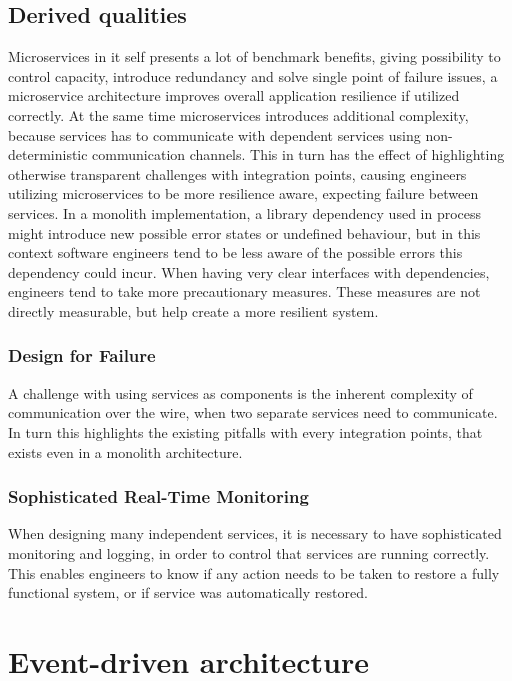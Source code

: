 \subsection{Derived qualities}
Microservices in it self presents a lot of benchmark benefits, giving possibility to control capacity, introduce redundancy and solve single point of failure issues, a microservice architecture improves overall application resilience if utilized correctly. At the same time microservices introduces additional complexity, because services has to communicate with dependent services using non-deterministic communication channels. This in turn has the effect of highlighting otherwise transparent challenges with integration points, causing engineers utilizing microservices to be more resilience aware, expecting failure between services. In a monolith implementation, a library dependency used in process might introduce new possible error states or undefined behaviour, but in this context software engineers tend to be less aware of the possible errors this dependency could incur. When having very clear interfaces with dependencies, engineers tend to take more precautionary measures. These measures are not directly measurable, but help create a more resilient system. 

\subsubsection*{Design for Failure}
A challenge with using services as components is the inherent complexity of communication over the wire, when two separate services need to communicate. In turn this highlights the existing pitfalls with every integration points, that exists even in a monolith architecture.

\subsubsection*{Sophisticated Real-Time Monitoring}
When designing many independent services, it is necessary to have sophisticated monitoring and logging, in order to control that services are running correctly. This enables engineers to know if any action needs to be taken to restore a fully functional system, or if service was automatically restored.


\section{Event-driven architecture}

